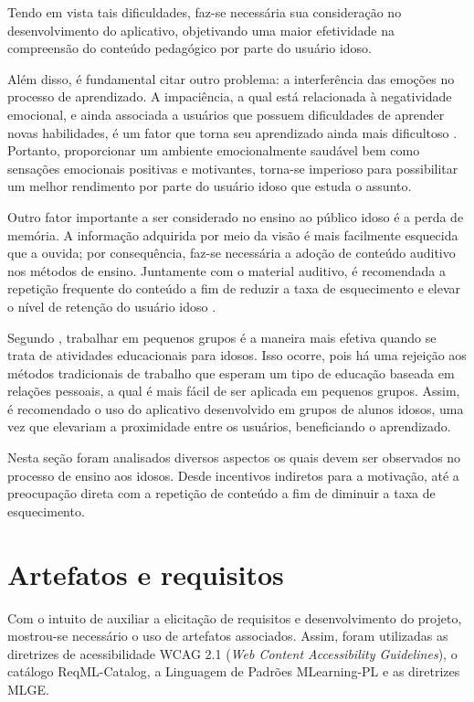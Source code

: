 Tendo em vista tais dificuldades, faz-se necessária sua consideração no desenvolvimento do aplicativo, objetivando uma maior efetividade na compreensão do conteúdo pedagógico por parte do usuário idoso.

Além disso, é fundamental citar outro problema: a interferência das emoções no processo de aprendizado. A impaciência, a qual está relacionada à negatividade emocional, e ainda associada a usuários que possuem dificuldades de aprender novas habilidades, é um fator que torna seu aprendizado ainda mais dificultoso \citep{Edukacja}. Portanto, proporcionar um ambiente emocionalmente saudável bem como sensações emocionais positivas e motivantes, torna-se imperioso para possibilitar um melhor rendimento por parte do usuário idoso que estuda o assunto.

Outro fator importante a ser considerado no ensino ao público idoso é a perda de memória. A informação adquirida por meio da visão é mais facilmente esquecida que a ouvida; por consequência,  faz-se necessária a adoção de conteúdo auditivo nos métodos de ensino. Juntamente com o material auditivo, é recomendada a repetição frequente do conteúdo a fim de reduzir a taxa de esquecimento e elevar o nível de retenção do usuário idoso \citep{euromed}.

Segundo \cite{Edukacja}, trabalhar em pequenos grupos é a maneira mais efetiva quando se trata de atividades educacionais para idosos. Isso ocorre, pois há uma rejeição aos métodos tradicionais de trabalho que esperam um tipo de educação baseada em relações pessoais, a qual é mais fácil de ser aplicada em pequenos grupos. Assim, é recomendado o uso do aplicativo desenvolvido em grupos de alunos idosos, uma vez que elevariam a proximidade entre os usuários, beneficiando o aprendizado.

Nesta seção foram analisados diversos aspectos os quais devem ser observados no processo de ensino aos idosos. Desde incentivos indiretos para a motivação, até a preocupação direta com a repetição de conteúdo a fim de diminuir a taxa de esquecimento. 

\section{Artefatos e requisitos}
\label{subsec:artefatos}
Com o intuito de auxiliar a elicitação de requisitos e desenvolvimento do projeto, mostrou-se necessário o uso de artefatos associados.
Assim, foram utilizadas as diretrizes de acessibilidade WCAG 2.1 (\textit{Web Content Accessibility Guidelines}), o catálogo ReqML-Catalog, a Linguagem de Padrões MLearning-PL e as diretrizes MLGE.

